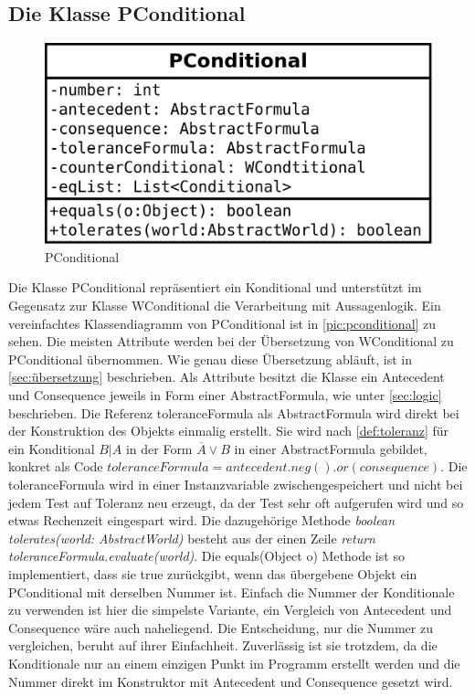 \documentclass[12pt,a4paper]{article}
\begin{document}
\subsection{Die Klasse PConditional}
\label{sec:pconditional}

\begin{figure}
\includegraphics[width=0.45\linewidth]{bilder/PConditional.png}
\caption{PConditional}
\label{pic:pconditional}
\end{figure}


Die Klasse PConditional repräsentiert ein Konditional und unterstützt im Gegensatz zur Klasse WConditional die Verarbeitung mit Aussagenlogik. Ein vereinfachtes Klassendiagramm von PConditional ist in \autoref{pic:pconditional} zu sehen. Die meisten Attribute werden bei der Übersetzung von WConditional zu PConditional übernommen. Wie genau diese Übersetzung abläuft, ist in \autoref{sec:übersetzung} beschrieben. Als Attribute besitzt die Klasse ein Antecedent und Consequence jeweils in Form einer AbstractFormula, wie unter \autoref{sec:logic} beschrieben. Die Referenz toleranceFormula als AbstractFormula wird direkt bei der Konstruktion des Objekts einmalig erstellt. Sie wird nach \autoref{def:toleranz} für ein Konditional $B|A$ in der Form $\overline{A} \vee B$ in einer AbstractFormula gebildet, konkret als Code  $toleranceFormula = antecedent.neg().or(consequence)$. Die toleranceFormula wird in einer Instanzvariable zwischengespeichert und nicht bei jedem Test   auf Toleranz neu erzeugt, da der Test sehr oft aufgerufen wird und so etwas Rechenzeit eingespart wird. Die dazugehörige Methode \textit{boolean tolerates(world: AbstractWorld)} besteht aus der einen Zeile \textit{return toleranceFormula.evaluate(world)}. Die equals(Object o) Methode ist so implementiert, dass sie true zurückgibt, wenn das übergebene Objekt ein PConditional mit derselben Nummer ist. Einfach die Nummer der Konditionale zu verwenden ist hier die simpelste Variante, ein Vergleich von Antecedent und Consequence wäre auch naheliegend. Die Entscheidung, nur die Nummer zu vergleichen, beruht auf ihrer Einfachheit. Zuverlässig ist sie trotzdem, da die Konditionale nur an einem einzigen Punkt im Programm erstellt werden und die Nummer direkt im Konstruktor mit Antecedent und Consequence gesetzt wird.
\end{document}
